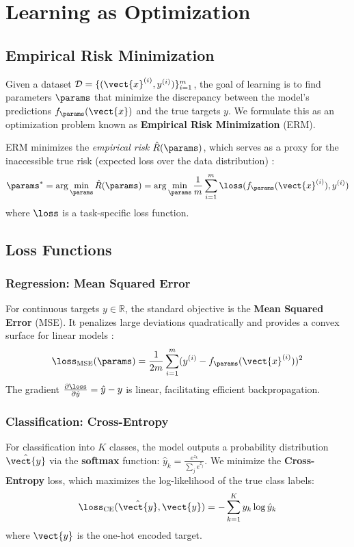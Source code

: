 \section{Learning as Optimization}

\subsection{Empirical Risk Minimization}

Given a dataset $\mathcal{D} = \{(\vect{x}^{(i)}, y^{(i)})\}_{i=1}^{m}$, the goal of learning is to find parameters $\params$ that minimize the discrepancy between the model's predictions $f_{\params}(\vect{x})$ and the true targets $y$. We formulate this as an optimization problem known as \textbf{Empirical Risk Minimization} (ERM).

ERM minimizes the \textit{empirical risk} $\hat{R}(\params)$, which serves as a proxy for the inaccessible true risk (expected loss over the data distribution) \cite{Vapnik1998}:
\begin{equation}
    \params^* = \arg\min_{\params} \hat{R}(\params) = \arg\min_{\params} \frac{1}{m} \sum_{i=1}^{m} \loss(f_{\params}(\vect{x}^{(i)}), y^{(i)})
\end{equation}
where $\loss$ is a task-specific loss function.

\subsection{Loss Functions}

\subsubsection{Regression: Mean Squared Error}
For continuous targets $y \in \mathbb{R}$, the standard objective is the \textbf{Mean Squared Error} (MSE). It penalizes large deviations quadratically and provides a convex surface for linear models \cite{Bishop2006}:
\begin{equation}
    \loss_{\text{MSE}}(\params) = \frac{1}{2m} \sum_{i=1}^{m} (y^{(i)} - f_{\params}(\vect{x}^{(i)}))^2
\end{equation}
The gradient $\frac{\partial \loss}{\partial \hat{y}} = \hat{y} - y$ is linear, facilitating efficient backpropagation.

\subsubsection{Classification: Cross-Entropy}
For classification into $K$ classes, the model outputs a probability distribution $\hat{\vect{y}}$ via the \textbf{softmax} function: $\hat{y}_k = \frac{e^{z_k}}{\sum_{j} e^{z_j}}$. We minimize the \textbf{Cross-Entropy} loss, which maximizes the log-likelihood of the true class labels:
\begin{equation}
    \loss_{\text{CE}}(\hat{\vect{y}}, \vect{y}) = -\sum_{k=1}^{K} y_k \log \hat{y}_k
\end{equation}
where $\vect{y}$ is the one-hot encoded target. 

